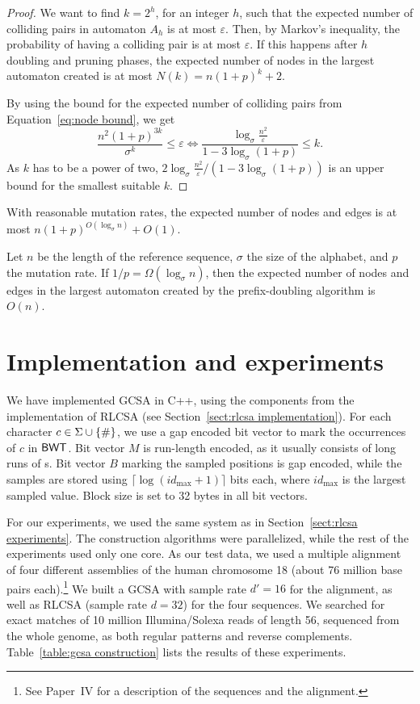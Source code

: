 \begin{proof}
We want to find $k = 2^{h}$, for an integer $h$, such that the expected number of colliding pairs in automaton $A_{h}$ is at most $\varepsilon$. Then, by Markov's inequality, the probability of having a colliding pair is at most $\varepsilon$. If this happens after $h$ doubling and pruning phases, the expected number of nodes in the largest automaton created is at most $N(k) = n(1+p)^{k} + 2$.

By using the bound for the expected number of colliding pairs from Equation~\ref{eq:node bound}, we get
\begin{displaymath}
\frac{n^{2} (1+p)^{3k}}{\sigma^{k}} \le \varepsilon
\iff
\frac{\log_{\sigma} \frac{n^{2}}{\varepsilon}}{1 - 3 \log_{\sigma} (1+p)} \le k.
\end{displaymath}
As $k$ has to be a power of two, $2 \log_{\sigma} \frac{n^{2}}{\varepsilon} / (1 - 3 \log_{\sigma} (1+p))$ is an upper bound for the smallest suitable $k$.
\end{proof}

With reasonable mutation rates, the expected number of nodes and edges is at most $n(1+p)^{O(\log_{\sigma} n)} + O(1)$.

\begin{theorem}
Let $n$ be the length of the reference sequence, $\sigma$ the size of the alphabet, and $p$ the mutation rate. If $1/p = \Omega(\log_{\sigma} n)$, then the expected number of nodes and edges in the largest automaton created by the prefix-doubling algorithm is $O(n)$.
\end{theorem}


\section{Implementation and experiments}

We have implemented GCSA in C++, using the components from the implementation of RLCSA (see Section~\ref{sect:rlcsa implementation}). For each character $c \in \Sigma \cup \{ \# \}$, we use a gap encoded bit vector to mark the occurrences of $c$ in $\mathsf{BWT}$. Bit vector $M$ is run-length encoded, as it usually consists of long runs of \onebit{}s. Bit vector $B$ marking the sampled positions is gap encoded, while the samples are stored using $\lceil \log (id_{\max} + 1) \rceil$ bits each, where $id_{\max}$ is the largest 
sampled value. Block size is set to 32 bytes in all bit vectors.

For our experiments, we used the same system as in Section~\ref{sect:rlcsa experiments}. The construction algorithms were parallelized, while the rest of the experiments used only one core. As our test data, we used a multiple alignment of four different assemblies of the human chromosome 18 (about 76 million base pairs each).\footnote{See Paper~IV for a description of the sequences and the alignment.} We built a GCSA with sample rate $d' = 16$ for the alignment, as well as RLCSA (sample rate $d=32$) for the four sequences. We searched for exact matches of 10 million Illumina/Solexa reads of length 56, sequenced from the whole genome, as both regular patterns and reverse complements. Table~\ref{table:gcsa construction} lists the results of these experiments.

